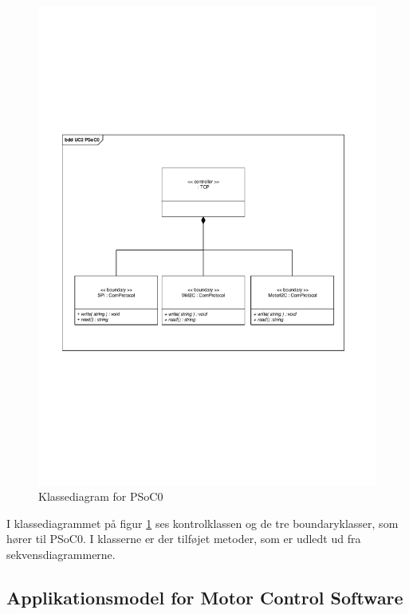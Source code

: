 \begin{figure}[H]
	\centering
	\includegraphics[width=\textwidth]{Systemarkitektur/images/klassediagramPSoC0}
	\caption{Klassediagram for PSoC0}
	\label{fig:klassePSoC0}
\end{figure}

I klassediagrammet på figur \ref{fig:klassePSoC0} ses kontrolklassen og de tre boundaryklasser, som hører til PSoC0. I klasserne er der tilføjet metoder, som er udledt ud fra sekvensdiagrammerne. 

\subsection{Applikationsmodel for Motor Control Software}

